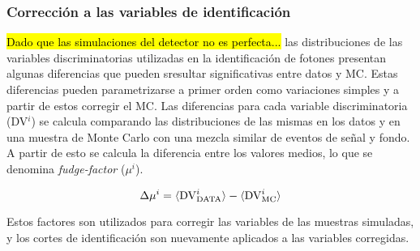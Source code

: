 



\subsubsection{Corrección a las variables de identificación}


\hl{Dado que las simulaciones del detector no es perfecta...}
las distribuciones de las variables discriminatorias utilizadas en la identificación
de fotones presentan algunas diferencias que pueden sresultar significativas entre datos y MC.
Estas diferencias pueden parametrizarse a primer orden como variaciones simples
y a partir de estos corregir el MC.
Las diferencias para cada variable discriminatoria (DV$^i$) se calcula
comparando las distribuciones de las mismas en los datos y en una muestra de
Monte Carlo con una mezcla similar de eventos de señal y fondo.
A partir de esto se calcula la diferencia
entre los valores medios, lo que se denomina \emph{fudge-factor} ($\mu^i$)\cite{ATLAS-CONF-2012-123}.

\begin{equation}
  \Delta \mu^i = \langle \mathrm{DV}^i_\text{DATA} \rangle - \langle \mathrm{DV}^i_\mathrm{MC} \rangle
\end{equation}

Estos factores son utilizados para corregir las variables de las
muestras simuladas, y los cortes de identificación son nuevamente
aplicados a las variables corregidas.


